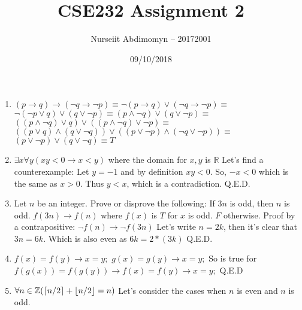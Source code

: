 \documentclass[12pt]{article}
\title{CSE232 Assignment 2}
\author{Nurseiit Abdimomyn -- 20172001}
\date{09/10/2018}
\DeclarePairedDelimiter{\ceil}{\lceil}{\rceil}
\DeclarePairedDelimiter{\floor}{\lfloor}{\rfloor}
\begin{document}
\maketitle

\begin{enumerate}
  \item
    $(p \to q) \to (\neg q \to \neg p) \equiv \neg (p \to q) \lor (\neg q \to \neg p) \equiv$
    \newline
    $\neg (\neg p \lor q) \lor (q \lor \neg p) \equiv (p \land \neg q) \lor (q \lor \neg p) \equiv$
    \newline
    $((p \land \neg q) \lor q) \lor ((p \land \neg q) \lor \neg p) \equiv$
    \newline
    $((p \lor q) \land (q \lor \neg q)) \lor ((p \lor \neg p) \land (\neg q \lor \neg p)) \equiv$
    \newline
    $(p \lor \neg p) \lor (q \lor \neg q) \equiv T$
  \item
    $\exists x \forall y (xy < 0 \to x < y)$ where the domain for $x, y$ is $\mathbb{R}$
    \newline
    Let's find a counterexample:
    \newline
    Let $y = -1$ and by definition $xy < 0$. So, $-x < 0$ which is the same as $x > 0$. Thus $y < x$, which is a contradiction. Q.E.D.
  \item
    Let $n$ be an integer.  Prove or disprove the following:  If $3n$ is odd, then $n$ is odd.
    \newline
    $f(3n) \to f(n)$ where $f(x)$ is $T$ for $x$ is odd. $F$ otherwise.
    \newline \newline
    Proof by a contrapositive:
    \newline
    $\neg f(n) \to \neg f(3n)$
    \newline
    Let's write $n = 2k$, then it's clear that $3n = 6k$. Which is also even as $6k = 2*(3k)$ Q.E.D.
  \item
    $f(x) = f(y) \to x = y;$ \newline
    $g(x) = g(y) \to x = y;$ \newline
    So is true for $f(g(x)) = f(g(y)) \to f(x) = f(y) \to x = y;$ \newline
    Q.E.D
  \item
    $\forall n \in \mathbb{Z} (\ceil{n/2} + \floor{n/2} = n)$ \newline
    Let's consider the cases when $n$ is even and $n$ is odd. \newline \newline

\end{enumerate}
\end{document}

